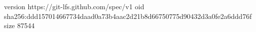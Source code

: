 version https://git-lfs.github.com/spec/v1
oid sha256:ddd157014667734daad0a73b4aac2d21b8d66750775d90432d3a0fe2a6ddd76f
size 87544
